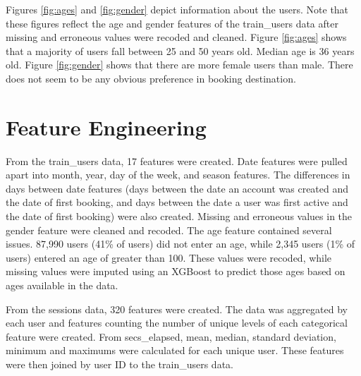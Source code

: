 \documentclass{article}
\begin{document}
Figures \ref{fig:ages} and \ref{fig:gender} depict information about the users. Note that these 
figures reflect the age and gender features of the train\_users data after missing and erroneous 
values were recoded and cleaned. Figure \ref{fig:ages} shows that a majority of users fall 
between 25 and 50 years old. Median age is 36 years old. Figure \ref{fig:gender} shows that there are more female users than 
male. There does not seem to be any obvious preference in booking destination. 




\section{Feature Engineering}

From the train\_users data, 17 features were created. Date features were pulled apart into 
month, year, day of the week, and season features. The differences in days between date features 
(days between the date an account was created and the date of first booking, and days between the date a 
user was first active and the date of first booking) were also created. Missing and erroneous values in the gender feature 
were cleaned and recoded. The age feature contained several issues. 87,990 users (41\% of users) did 
not enter an age, while 2,345 users (1\% of users) entered an age of greater than 100. These values 
were recoded, while missing values were imputed using an XGBoost to predict those 
ages based on ages available in the data. 

From the sessions data, 320 features were created. The data was aggregated by each user and 
features counting the number of unique levels of each categorical feature were created. From secs\_elapsed, 
mean, median, standard deviation, minimum and maximums were calculated for each unique user. These features 
were then joined by user ID to the train\_users data. 
\end{document}

